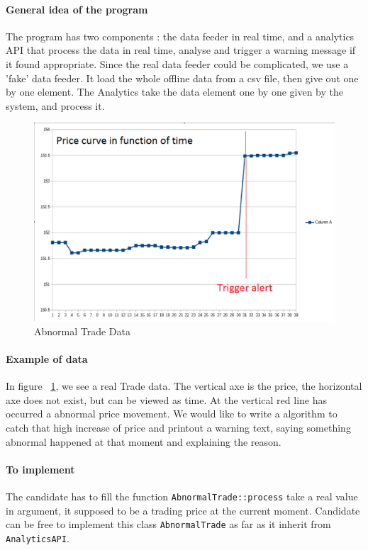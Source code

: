\documentclass{exam}%
\begin{document}
\paragraph{General idea of the program}
The program has two components : the data feeder in real time, and a analytics API that process the data in real time, analyse and trigger a warning message if it found appropriate. Since the real data feeder could be complicated, we use a 'fake' data feeder. It load the whole offline data from a csv file, then give out one by one element. The Analytics take the data element one by one given by the system, and process it.

\begin{figure}[h]
\centering
\includegraphics[scale=0.3]{data}
\caption{Abnormal Trade Data}
\label{fig:data}
\end{figure}

\paragraph{Example of data} In figure ~\ref{fig:data}, we see a real Trade data. The vertical axe is the price, the horizontal axe does not exist, but can be viewed as time. At the vertical red line has occurred a abnormal price movement. We would like to write a algorithm to catch that high increase of price and printout a warning text, saying something abnormal happened at that moment and explaining the reason.

\paragraph{To implement}
The candidate has to fill the function \lstinline{AbnormalTrade::process} take a real value in argument, it supposed to be a trading price at the current moment. Candidate can be free to implement this class \lstinline{AbnormalTrade} as far as it inherit from \lstinline{AnalyticsAPI}.
\end{document}
